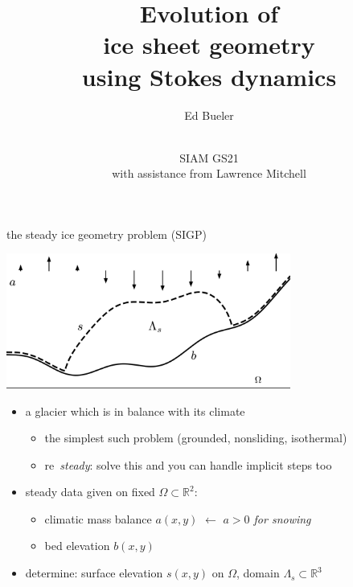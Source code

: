 \documentclass[usepdftitle=false]{beamer}
\title{Evolution of \\ ice sheet geometry \\ using Stokes dynamics}
\author{Ed Bueler}
\date{\phantom{foo} \bigskip \bigskip \bigskip \\ SIAM GS21 \\ with assistance from Lawrence Mitchell}
\newcommand{\RR}{\mathbb{R}}
\begin{document}
\begin{frame}
	\maketitle
\end{frame}


\begin{frame}{the steady ice geometry problem (SIGP)}

\vspace{-2mm}
\begin{center}
\includegraphics[width=0.7\textwidth]{figs/stokesdomain.png}
\end{center}

\vspace{-1mm}
\begin{itemize}
\item a glacier which is in balance with its climate
    \begin{itemize}
    \item the simplest such problem (grounded, nonsliding, isothermal)
    \item re~\emph{steady}: solve this and you can handle implicit steps too
    \end{itemize}
\item steady data given on fixed $\Omega \subset \RR^2$:
    \begin{itemize}
    \item climatic mass balance $a(x,y)$ \hfill $\gets$ \emph{$a>0$ for snowing}
    \item bed elevation $b(x,y)$
    \end{itemize}
\item determine: surface elevation $s(x,y)$ on $\Omega$, domain $\Lambda_s \subset \RR^3$
\end{itemize}
\end{frame}
\end{document}
